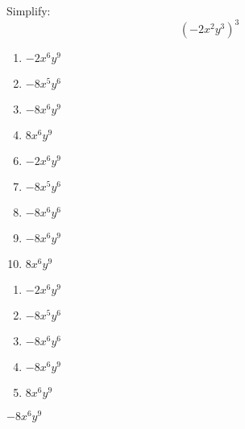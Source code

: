 



  Simplify: \[(-2x^{2}y^{3})^{3}\]



\ifsat
	\begin{enumerate}[label=\Alph*)]
		\item   $-2x^{6}y^{9}$
		\item  $-8x^{5}y^{6}$
		\item  $-8x^{6}y^{9}$%
		\item   $8x^{6}y^{9}$
	\end{enumerate}
\else
\fi

\ifacteven
	\begin{enumerate}[label=\textbf{\Alph*.},itemsep=\fill,align=left]
		\setcounter{enumii}{5}
		\item   $-2x^{6}y^{9}$
		\item  $-8x^{5}y^{6}$
		\item  $-8x^{6}y^{6}$
		\addtocounter{enumii}{1}
		\item  $-8x^{6}y^{9}$%
		\item   $8x^{6}y^{9}$
	\end{enumerate}
\else
\fi

\ifactodd
	\begin{enumerate}[label=\textbf{\Alph*.},itemsep=\fill,align=left]
		\item   $-2x^{6}y^{9}$
		\item  $-8x^{5}y^{6}$
		\item  $-8x^{6}y^{6}$
		\item  $-8x^{6}y^{9}$%
		\item   $8x^{6}y^{9}$
	\end{enumerate}
\else
\fi

\ifgridin
  $-8x^{6}y^{9}$%
		
\else
\fi

